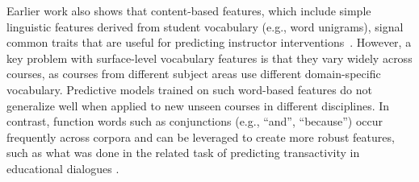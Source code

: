 \documentclass[letterpaper]{article}
\begin{document}
Earlier work also shows that content-based features, which
include simple linguistic features derived from student vocabulary 
(e.g., word unigrams), 
signal common traits that are useful for predicting instructor 
interventions~\cite{chandrasekaran2015learning,chaturvedi2014predicting}. 
However, a key problem with surface-level vocabulary features is that they 
vary widely across courses, as courses from different subject areas use 
different domain-specific vocabulary. Predictive models trained on such 
word-based 
features do not generalize well when applied to new unseen courses in different 
disciplines. In contrast, function words such as conjunctions (e.g., ``and'', 
``because'') occur frequently across corpora and can be leveraged to 
create more robust features, 
such as what was done in the related task of predicting transactivity in 
educational dialogues \cite{joshi2007}.


\end{document}
